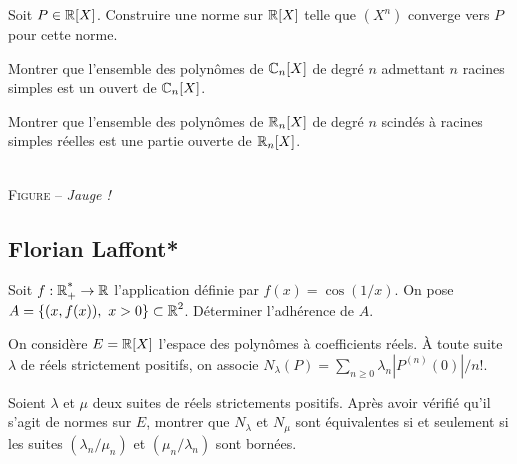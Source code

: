 \documentclass[10pt]{scrartcl}
\begin{document}
    \begin{exo}
        Soit $P\in\operatorname{\mathbb R}[X]$. Construire une norme sur $\operatorname{\mathbb R}[X]$ telle que $(X^n)$ converge vers $P$ pour cette norme.
    \end{exo}

    \begin{exo}
        Montrer que l'ensemble des polynômes de $\operatorname{\mathbb C}_n[X]$ de degré $n$ admettant $n$ racines simples est un ouvert de $\operatorname{\mathbb C}_n[X]$.
    \end{exo}

    \begin{exo}
        Montrer que l'ensemble des polynômes de $\operatorname{\mathbb R}_n[X]$ de degré $n$ scindés à racines simples réelles est une partie ouverte de $\operatorname{\mathbb R}_n[X]$.
    \end{exo}

    \vspace{2em}
    \begin{center}
        \\
        \vspace{10pt}
        \textsc{Figure} – \textit{Jauge !}
    \end{center}

    \newpage
    \subsection*{Florian Laffont*}
    \begin{exo}
        Soit $f:\operatorname{\mathbb R_+^*}\to\operatorname{\mathbb R}$ l'application définie par $f(x)=\cos(1/x)$. 
        On pose $A=\lbrace (x,f(x)),\ x>0\rbrace\subset\R^2$. Déterminer l'adhérence de $A$.
    \end{exo}

    \begin{exo}
        On considère $E=\operatorname{\mathbb R}[X]$ l'espace des polynômes à coefficients réels. À toute suite $\lambda$ de réels strictement positifs, on associe $N_\lambda(P)=\sum_{n\geq 0}\lambda_n|{P^{(n)}(0)}|/{n!}$.

        Soient $\lambda$ et $\mu$ deux suites de réels strictements positifs. 
        Après avoir vérifié qu'il s'agit de normes sur $E$, montrer que $N_\lambda$ et $N_\mu$ sont équivalentes si et seulement si les suites $(\lambda_n/\mu_n)$ et $(\mu_n/\lambda_n)$ sont bornées.
    \end{exo}
\end{document}
